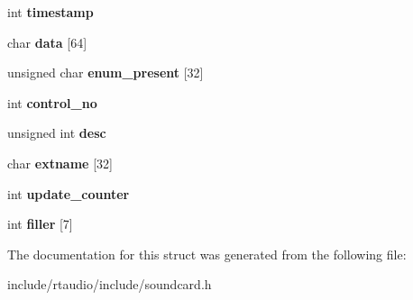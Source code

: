 \begin{DoxyCompactItemize}
\item 
int {\bfseries timestamp}\hypertarget{structoss__mixext_ad54e281951384807af93a645eeb368d2}{}\label{structoss__mixext_ad54e281951384807af93a645eeb368d2}

\item 
char {\bfseries data} \mbox{[}64\mbox{]}\hypertarget{structoss__mixext_ab6c4ff64867771f6a192c17c6a007569}{}\label{structoss__mixext_ab6c4ff64867771f6a192c17c6a007569}

\item 
unsigned char {\bfseries enum\+\_\+present} \mbox{[}32\mbox{]}\hypertarget{structoss__mixext_aac11122cd6533cba22791bf5fe742844}{}\label{structoss__mixext_aac11122cd6533cba22791bf5fe742844}

\item 
int {\bfseries control\+\_\+no}\hypertarget{structoss__mixext_a5e16995e2d2b165ed1884cfed781e110}{}\label{structoss__mixext_a5e16995e2d2b165ed1884cfed781e110}

\item 
unsigned int {\bfseries desc}\hypertarget{structoss__mixext_a6c31b7d507deb923f7871e53733a8da7}{}\label{structoss__mixext_a6c31b7d507deb923f7871e53733a8da7}

\item 
char {\bfseries extname} \mbox{[}32\mbox{]}\hypertarget{structoss__mixext_a9687bb26b167852f22bc2d6c1c23df0d}{}\label{structoss__mixext_a9687bb26b167852f22bc2d6c1c23df0d}

\item 
int {\bfseries update\+\_\+counter}\hypertarget{structoss__mixext_a3803342635e09dc4940c409e0dec35b6}{}\label{structoss__mixext_a3803342635e09dc4940c409e0dec35b6}

\item 
int {\bfseries filler} \mbox{[}7\mbox{]}\hypertarget{structoss__mixext_a037281b9c05b5f03d4093fb7f8b0a7be}{}\label{structoss__mixext_a037281b9c05b5f03d4093fb7f8b0a7be}

\end{DoxyCompactItemize}


The documentation for this struct was generated from the following file\+:\begin{DoxyCompactItemize}
\item 
include/rtaudio/include/soundcard.\+h\end{DoxyCompactItemize}
